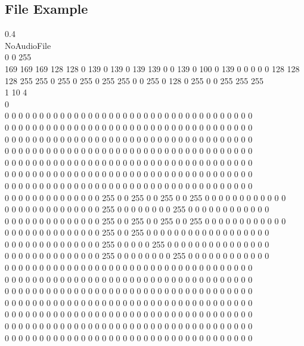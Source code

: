 \subsection{File Example}

0.4  \\
NoAudioFile\\
0 0 255 \\
169 169 169 128 128 0 139 0 139 0 139 139 0 0 139 0 100 0 139 0 0 0 0 0 128 128 128 255 255 0 255 0 255 0 255 255 0 0 255 0 128 0 255 0 0 255 255 255 \\
1 10 4 \\
0 \\
0 0 0 0 0 0 0 0 0 0 0 0 0 0 0 0 0 0 0 0 0 0 0 0 0 0 0 0 0 0 0 0 0 0 0 0 \\
0 0 0 0 0 0 0 0 0 0 0 0 0 0 0 0 0 0 0 0 0 0 0 0 0 0 0 0 0 0 0 0 0 0 0 0 \\
0 0 0 0 0 0 0 0 0 0 0 0 0 0 0 0 0 0 0 0 0 0 0 0 0 0 0 0 0 0 0 0 0 0 0 0 \\
0 0 0 0 0 0 0 0 0 0 0 0 0 0 0 0 0 0 0 0 0 0 0 0 0 0 0 0 0 0 0 0 0 0 0 0 \\
0 0 0 0 0 0 0 0 0 0 0 0 0 0 0 0 0 0 0 0 0 0 0 0 0 0 0 0 0 0 0 0 0 0 0 0 \\
0 0 0 0 0 0 0 0 0 0 0 0 0 0 0 0 0 0 0 0 0 0 0 0 0 0 0 0 0 0 0 0 0 0 0 0 \\
0 0 0 0 0 0 0 0 0 0 0 0 0 0 0 0 0 0 0 0 0 0 0 0 0 0 0 0 0 0 0 0 0 0 0 0 \\
0 0 0 0 0 0 0 0 0 0 0 0 0 0 255 0 0 255 0 0 255 0 0 255 0 0 0 0 0 0 0 0 0 0 0 0\\ 
0 0 0 0 0 0 0 0 0 0 0 0 0 0 255 0 0 0 0 0 0 0 0 255 0 0 0 0 0 0 0 0 0 0 0 0 \\
0 0 0 0 0 0 0 0 0 0 0 0 0 0 255 0 0 255 0 0 255 0 0 255 0 0 0 0 0 0 0 0 0 0 0 0\\ 
0 0 0 0 0 0 0 0 0 0 0 0 0 0 255 0 0 255 0 0 0 0 0 0 0 0 0 0 0 0 0 0 0 0 0 0 \\
0 0 0 0 0 0 0 0 0 0 0 0 0 0 255 0 0 0 0 0 255 0 0 0 0 0 0 0 0 0 0 0 0 0 0 0 \\
0 0 0 0 0 0 0 0 0 0 0 0 0 0 255 0 0 0 0 0 0 0 0 255 0 0 0 0 0 0 0 0 0 0 0 0 \\
0 0 0 0 0 0 0 0 0 0 0 0 0 0 0 0 0 0 0 0 0 0 0 0 0 0 0 0 0 0 0 0 0 0 0 0 \\
0 0 0 0 0 0 0 0 0 0 0 0 0 0 0 0 0 0 0 0 0 0 0 0 0 0 0 0 0 0 0 0 0 0 0 0 \\
0 0 0 0 0 0 0 0 0 0 0 0 0 0 0 0 0 0 0 0 0 0 0 0 0 0 0 0 0 0 0 0 0 0 0 0 \\
0 0 0 0 0 0 0 0 0 0 0 0 0 0 0 0 0 0 0 0 0 0 0 0 0 0 0 0 0 0 0 0 0 0 0 0 \\
0 0 0 0 0 0 0 0 0 0 0 0 0 0 0 0 0 0 0 0 0 0 0 0 0 0 0 0 0 0 0 0 0 0 0 0 \\
0 0 0 0 0 0 0 0 0 0 0 0 0 0 0 0 0 0 0 0 0 0 0 0 0 0 0 0 0 0 0 0 0 0 0 0 \\
0 0 0 0 0 0 0 0 0 0 0 0 0 0 0 0 0 0 0 0 0 0 0 0 0 0 0 0 0 0 0 0 0 0 0 0 \\\\

